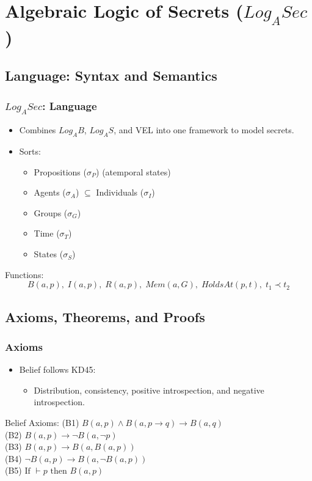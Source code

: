 \documentclass[aspectratio=169]{beamer}
\begin{document}
\section{Algebraic Logic of Secrets ($Log_ASec$)}

\subsection{Language: Syntax and Semantics}
\begin{frame}
\frametitle{$Log_ASec$: Language}
\begin{itemize}
    \item Combines $Log_AB$, $Log_AS$, and VEL into one framework to model secrets.
    \item Sorts:
    \begin{itemize}
        \item Propositions ($\sigma_P$) (atemporal states)
        \item Agents ($\sigma_A$) $\subseteq$ Individuals ($\sigma_I$)
        \item Groups ($\sigma_G$)
        \item Time ($\sigma_T$)
        \item States ($\sigma_S$)
    \end{itemize}
\end{itemize}
\begin{block}{Functions:}
\[
B(a, p), \; I(a, p), \; R(a, p), \;
Mem(a, G), \; HoldsAt(p, t), \; t_1 \prec t_2
\]
\end{block}
\end{frame}

\subsection{Axioms, Theorems, and Proofs}
\begin{frame}
\frametitle{Axioms}
\Large 
\begin{itemize}
    \item Belief follows KD45:
    \begin{itemize}
        \Large 
        \item Distribution, consistency, positive introspection, and negative introspection.
    \end{itemize}
\end{itemize}
\begin{block}{Belief Axioms:}
    \Large
    \normalfont
    (B1) $B(a, p) \wedge B(a, p \rightarrow q) \rightarrow B(a, q)$ \\
    (B2) $B(a, p) \rightarrow \neg B(a, \neg p)$ \\
    (B3) $B(a, p) \rightarrow B(a, B(a, p))$ \\
    (B4) $\neg B(a, p) \rightarrow B(a, \neg B(a, p))$ \\    
    (B5) $\text{If } \vdash p \text{ then } B(a, p)$
\end{block}
\end{frame}
\end{document}
